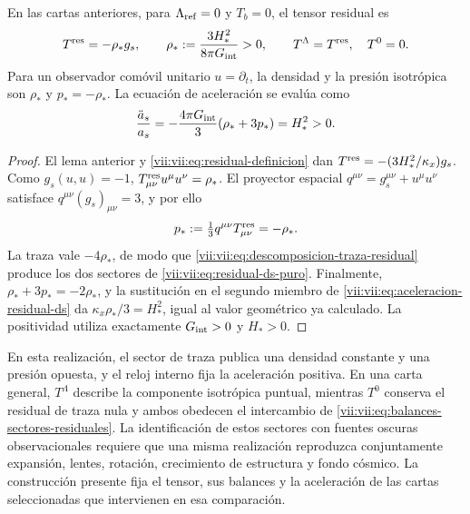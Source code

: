 \begin{theorem}
\label{vii:vii:thm:residual-ds-aceleracion}
En las cartas anteriores, para \(\Lambda_{\rm ref}=0\) y \(T_b=0\),
el tensor residual es
\begin{equation}
 T^{\rm res}=-\rho_*g_s,\qquad
 \rho_*:=\frac{3H_*^2}{8\pi G_{\rm int}}>0,
 \qquad T^\Lambda=T^{\rm res},\quad T^0=0.
 \label{vii:vii:eq:residual-ds-puro}
\end{equation}
Para un observador comóvil unitario \(u=\partial_t\), la densidad
y la presión isotrópica son \(\rho_*\) y \(p_*=-\rho_*\).
La ecuación de aceleración se evalúa como
\begin{equation}
 \frac{\ddot a_s}{a_s}
 =-\frac{4\pi G_{\rm int}}3(\rho_*+3p_*)=H_*^2>0.
 \label{vii:vii:eq:aceleracion-residual-ds}
\end{equation}
\end{theorem}
\begin{proof}
El lema anterior y \eqref{vii:vii:eq:residual-definicion} dan
\(T^{\rm res}=-(3H_*^2/\kappa_x)g_s\).
Como \(g_s(u,u)=-1\),
\(T^{\rm res}_{\mu\nu}u^\mu u^\nu=\rho_*\).
El proyector espacial \(q^{\mu\nu}=g_s^{\mu\nu}+u^\mu u^\nu\)
satisface \(q^{\mu\nu}(g_s)_{\mu\nu}=3\), y por ello
\[
 p_*:=\tfrac13q^{\mu\nu}T^{\rm res}_{\mu\nu}=-\rho_*.
\]
La traza vale \(-4\rho_*\), de modo que
\eqref{vii:vii:eq:descomposicion-traza-residual} produce los dos sectores
de \eqref{vii:vii:eq:residual-ds-puro}. Finalmente,
\(\rho_*+3p_*=-2\rho_*\), y la sustitución en el segundo miembro
de \eqref{vii:vii:eq:aceleracion-residual-ds} da
\(\kappa_x\rho_*/3=H_*^2\), igual al valor geométrico ya calculado.
La positividad utiliza exactamente \(G_{\rm int}>0\) y \(H_*>0\).
\end{proof}

En esta realización, el sector de traza publica una densidad constante
y una presión opuesta, y el reloj interno fija la aceleración positiva.
En una carta general, \(T^\Lambda\) describe la componente isotrópica
puntual, mientras \(T^0\) conserva el residual de traza nula y ambos
obedecen el intercambio de \eqref{vii:vii:eq:balances-sectores-residuales}.
La identificación de estos sectores con fuentes oscuras observacionales
requiere que una misma realización reproduzca conjuntamente expansión,
lentes, rotación, crecimiento de estructura y fondo cósmico. La
construcción presente fija el tensor, sus balances y la aceleración de
las cartas seleccionadas que intervienen en esa comparación.
